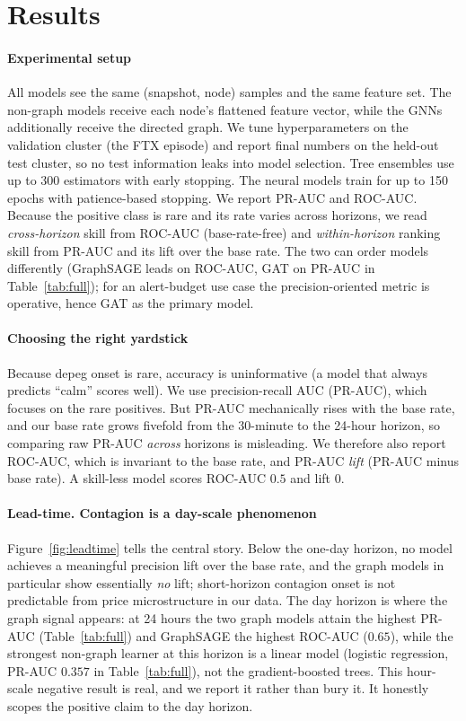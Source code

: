 \documentclass[sigconf,anonymous]{acmart}
\begin{document}
\section{Results}\label{sec:results}
\paragraph{Experimental setup} All models see the same (snapshot, node) samples and the same feature
set. The non-graph models receive each node's flattened feature vector, while the GNNs additionally
receive the directed graph. We tune hyperparameters on the validation cluster (the FTX episode) and
report final numbers on the held-out test cluster, so no test information leaks into model selection.
Tree ensembles use up to 300 estimators with early stopping. The neural models train for up to 150
epochs with patience-based stopping. We report PR-AUC and ROC-AUC. Because the positive class is rare and its rate varies across
horizons, we read \emph{cross-horizon} skill from ROC-AUC (base-rate-free) and
\emph{within-horizon} ranking skill from PR-AUC and its lift over the base rate. The two can
order models differently (GraphSAGE leads on ROC-AUC, GAT on PR-AUC in Table~\ref{tab:full});
for an alert-budget use case the precision-oriented metric is operative, hence GAT as the
primary model.

\paragraph{Choosing the right yardstick} Because depeg onset is rare, accuracy is uninformative
(a model that always predicts ``calm'' scores well). We use precision-recall AUC (PR-AUC), which
focuses on the rare positives. But PR-AUC mechanically rises with the base rate, and our base rate
grows fivefold from the 30-minute to the 24-hour horizon, so comparing raw PR-AUC \emph{across}
horizons is misleading. We therefore also report ROC-AUC, which is invariant to the base rate, and
PR-AUC \emph{lift} (PR-AUC minus base rate). A skill-less model scores ROC-AUC $0.5$ and lift $0$.

\paragraph{Lead-time. Contagion is a day-scale phenomenon} Figure~\ref{fig:leadtime} tells the
central story. Below the one-day horizon, no model achieves a meaningful precision lift over the base
rate, and the graph models in particular show essentially \emph{no} lift; short-horizon contagion
onset is not predictable from price microstructure in our data. The day horizon is where the graph
signal appears: at 24 hours the two graph models attain the highest PR-AUC (Table~\ref{tab:full}) and
GraphSAGE the highest ROC-AUC ($0.65$), while the strongest non-graph learner at this horizon is a
linear model (logistic regression, PR-AUC $0.357$ in Table~\ref{tab:full}), not the gradient-boosted trees. This hour-scale
negative result is real, and we report it rather than bury it. It honestly scopes the positive claim
to the day horizon.
\end{document}
